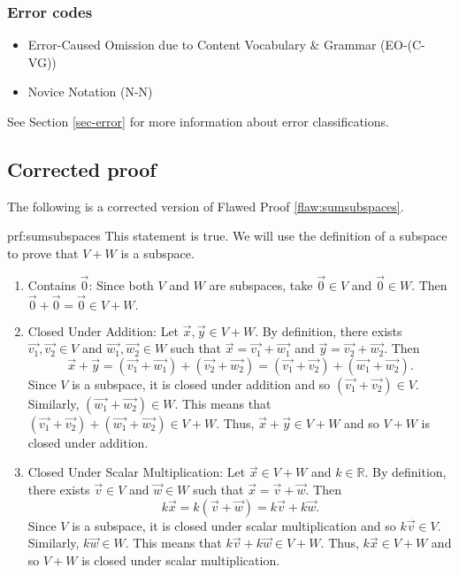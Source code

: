 \subsubsection{Error codes}
\begin{itemize}
	\item 	Error-Caused Omission due to Content Vocabulary $\&$ Grammar (EO-(C-VG))
	\item   Novice Notation (N-N)
\end{itemize}
See Section \ref{sec-error} for more information about error classifications.

\clearpage
\subsection{Corrected proof}

The following is a corrected version of Flawed Proof \ref{flaw:sumsubspaces}. %

\begin{prf}{prf:sumsubspaces} %
This statement is true. We will use the definition of a subspace to prove that $V+W$ is a subspace.

\begin{enumerate}
\item Contains $\vec{0}$: Since both $V$ and $W$ are subspaces, take $\vec{0} \in V$ and $\vec{0} \in W$. Then $\vec{0} + \vec{0} = \vec{0} \in V + W.$
\item Closed Under Addition: Let $\vec{x}, \vec{y} \in V+W$. By definition, there exists $\vec{v_1}, \vec{v_2} \in V$ and $\vec{w_1}, \vec{w_2} \in W$ such that $\vec{x} = \vec{v_1} +\vec{w_1}$ and $\vec{y} = \vec{v_2} +\vec{w_2}$. Then
$$\vec{x} + \vec{y} = (\vec{v_1} +\vec{w_1}) + (\vec{v_2} +\vec{w_2}) = (\vec{v_1} +\vec{v_2}) + (\vec{w_1} +\vec{w_2}).$$
Since $V$ is a subspace, it is closed under addition and so $(\vec{v_1} +\vec{v_2}) \in V$. Similarly, $(\vec{w_1} +\vec{w_2}) \in W$. This means that $(\vec{v_1} +\vec{v_2}) + (\vec{w_1} +\vec{w_2}) \in V + W$. Thus, $\vec{x} + \vec{y} \in V+W$ and so $V+W$ is closed under addition.
\item Closed Under Scalar Multiplication: Let  $\vec{x} \in V+W$ and $k \in \mathbb{R}.$ By definition, there exists $\vec{v} \in V$ and $\vec{w} \in W$ such that $\vec{x} = \vec{v} +\vec{w}$. Then
$$k\vec{x} = k(\vec{v} +\vec{w})= k\vec{v} + k\vec{w}.$$
Since $V$ is a subspace, it is closed under scalar multiplication and so $k\vec{v} \in V$. Similarly, $k\vec{w} \in W$. This means that $k\vec{v} + k\vec{w} \in V+W$. Thus, $k\vec{x} \in V+W$ and so $V+W$ is closed under scalar multiplication.
\end{enumerate}
\end{prf}
